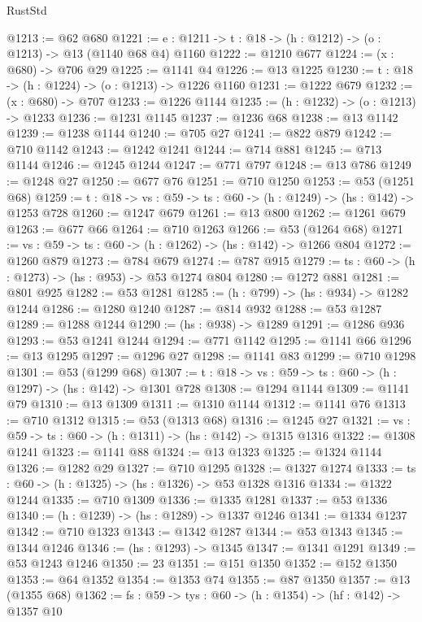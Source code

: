 \begin{lexlean}{RustStd}
\begin{coremodule}
@1213 := @62 @680
@1221 := {e : @1211} -> {t : @18} -> (h : @1212) -> (o : @1213) -> @13 (@1140 @68 @4) @1160
@1222 := @1210 @677
@1224 := (x : @680) -> @706 @29
@1225 := @1141 @4
@1226 := @13 @1225
@1230 := {t : @18} -> (h : @1224) -> (o : @1213) -> @1226 @1160
@1231 := @1222 @679
@1232 := (x : @680) -> @707
@1233 := @1226 @1144
@1235 := (h : @1232) -> (o : @1213) -> @1233
@1236 := @1231 @1145
@1237 := @1236 @68
@1238 := @13 @1142
@1239 := @1238 @1144
@1240 := @705 @27
@1241 := @822 @879
@1242 := @710 @1142
@1243 := @1242 @1241
@1244 := @714 @881
@1245 := @713 @1144
@1246 := @1245 @1244
@1247 := @771 @797
@1248 := @13 @786
@1249 := @1248 @27
@1250 := @677 @76
@1251 := @710 @1250
@1253 := @53 (@1251 @68)
@1259 := {t : @18} -> {vs : @59} -> {ts : @60} -> (h : @1249) -> (hs : @142) -> @1253 @728
@1260 := @1247 @679
@1261 := @13 @800
@1262 := @1261 @679
@1263 := @677 @66
@1264 := @710 @1263
@1266 := @53 (@1264 @68)
@1271 := {vs : @59} -> {ts : @60} -> (h : @1262) -> (hs : @142) -> @1266 @804
@1272 := @1260 @879
@1273 := @784 @679
@1274 := @787 @915
@1279 := {ts : @60} -> (h : @1273) -> (hs : @953) -> @53 @1274 @804
@1280 := @1272 @881
@1281 := @801 @925
@1282 := @53 @1281
@1285 := (h : @799) -> (hs : @934) -> @1282 @1244
@1286 := @1280 @1240
@1287 := @814 @932
@1288 := @53 @1287
@1289 := @1288 @1244
@1290 := (hs : @938) -> @1289
@1291 := @1286 @936
@1293 := @53 @1241 @1244
@1294 := @771 @1142
@1295 := @1141 @66
@1296 := @13 @1295
@1297 := @1296 @27
@1298 := @1141 @83
@1299 := @710 @1298
@1301 := @53 (@1299 @68)
@1307 := {t : @18} -> {vs : @59} -> {ts : @60} -> (h : @1297) -> (hs : @142) -> @1301 @728
@1308 := @1294 @1144
@1309 := @1141 @79
@1310 := @13 @1309
@1311 := @1310 @1144
@1312 := @1141 @76
@1313 := @710 @1312
@1315 := @53 (@1313 @68)
@1316 := @1245 @27
@1321 := {vs : @59} -> {ts : @60} -> (h : @1311) -> (hs : @142) -> @1315 @1316
@1322 := @1308 @1241
@1323 := @1141 @88
@1324 := @13 @1323
@1325 := @1324 @1144
@1326 := @1282 @29
@1327 := @710 @1295
@1328 := @1327 @1274
@1333 := {ts : @60} -> (h : @1325) -> (hs : @1326) -> @53 @1328 @1316
@1334 := @1322 @1244
@1335 := @710 @1309
@1336 := @1335 @1281
@1337 := @53 @1336
@1340 := (h : @1239) -> (hs : @1289) -> @1337 @1246
@1341 := @1334 @1237
@1342 := @710 @1323
@1343 := @1342 @1287
@1344 := @53 @1343
@1345 := @1344 @1246
@1346 := (hs : @1293) -> @1345
@1347 := @1341 @1291
@1349 := @53 @1243 @1246
@1350 := 23
@1351 := @151 @1350
@1352 := @152 @1350
@1353 := @64 @1352
@1354 := @1353 @74
@1355 := @87 @1350
@1357 := @13 (@1355 @68)
@1362 := {fs : @59} -> {tys : @60} -> (h : @1354) -> (hf : @142) -> @1357 @10

\end{coremodule}
\end{lexlean}

